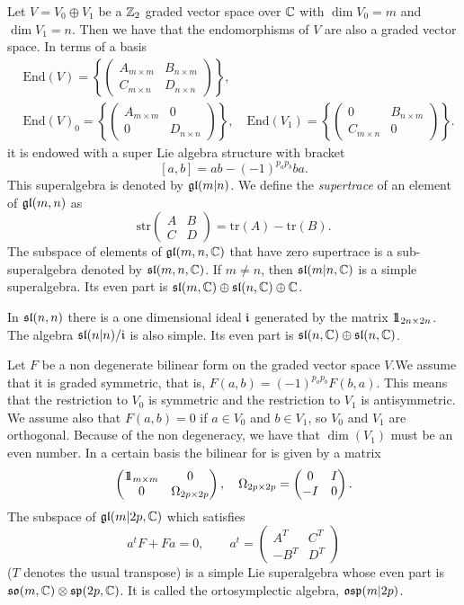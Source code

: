 \documentclass[a4paper,12pt]{article}
\begin{document}
Let $V=V_0\oplus V_1$ be a $\mathbb{Z}_2$ graded vector space over $\mathbb{C}$
with $\dim V_0=m$ and $\dim V_1=n$. Then we have that the
endomorphisms of $V$ are also a graded vector space. In terms of a
basis
\begin{eqnarray*}&\mathrm{End}(V)=\left\{\begin{pmatrix} A_{m\times
m}&B_{n\times m}\\C_{m\times n}&D_{n\times
n}\end{pmatrix}\right\},\\&
\mathrm{End}(V)_0=\left\{\begin{pmatrix} A_{m\times
m}&0\\0&D_{n\times n}\end{pmatrix}\right\}, \quad
\mathrm{End}(V_1)=\left\{\begin{pmatrix} 0&B_{n\times
m}\\C_{m\times n}&0\end{pmatrix}\right\}.\end{eqnarray*} it is
endowed with a super Lie algebra structure with bracket
$$[a,b]=ab-(-1)^{p_ap_b}ba.$$ This superalgebra is denoted by
$\mathfrak{gl}(m|n)$.  We define the {\it supertrace} of an element of
$\mathfrak{gl}(m,n)$ as $$\mathrm{str}\begin{pmatrix}
A&B\\C&D\end{pmatrix}=\mathrm{tr}(A)-\mathrm{tr}(B).$$ The
subspace of elements of $\mathfrak{gl}(m,n,\mathbb{C})$ that have zero supertrace
is a sub-superalgebra denoted by $\mathfrak{sl}(m,n,\mathbb{C})$. If $m\neq n$,
then $\mathfrak{sl}(m|n,\mathbb{C})$ is a simple superalgebra. Its  even part is
$\mathfrak{sl}(m,\mathbb{C})\oplus\mathfrak{sl}(n,\mathbb{C})\oplus \mathbb{C}$.

In $\mathfrak{sl}(n,n)$ there is a one dimensional ideal $\mathfrak{i}$ generated
by the matrix $\relax{\rm 1\kern-.35em 1}_{2n\times 2n}$. The algebra $\mathfrak{sl}(n|n)/\mathfrak{i}$ is
also simple. Its even part is $\mathfrak{sl}(n,\mathbb{C})\oplus\mathfrak{sl}(n,\mathbb{C})$.

\bigskip

Let $F$ be a non degenerate bilinear form on the graded vector
space $V$.We assume that it is graded symmetric, that is,
$F(a,b)=(-1)^{p_ap_b}F(b,a)$.  This means that the restriction to
$V_0$ is symmetric and the restriction to $V_1$ is antisymmetric.
We assume also that $F(a,b)=0$ if $a\in V_0$ and $b\in V_1$, so
$V_0$ and $V_1$ are orthogonal. Because of the non degeneracy, we
have that $\dim(V_1)$ must be an even number. In a certain basis
the bilinear for is given by a matrix
$$\begin{pmatrix}\relax{\rm 1\kern-.35em 1}_{m\times m}&0\\0&\Omega_{2p\times
2p}\end{pmatrix}, \quad \Omega_{2p\times
2p}=\begin{pmatrix}0&I\\-I&0\end{pmatrix}.$$ The subspace of
$\mathfrak{gl}(m|2p,\mathbb{C})$ which satisfies $$a^tF+Fa=0, \qquad
a^t=\begin{pmatrix} A^T&C^T\\-B^T&D^T\end{pmatrix}$$ ($T$ denotes
the usual transpose) is a simple Lie superalgebra whose even part
is $\mathfrak{so}(m, \mathbb{C})\otimes\mathfrak{sp}(2p,\mathbb{C})$. It is called the
ortosymplectic algebra, $\mathfrak{osp}(m|2p)$.
\end{document}
